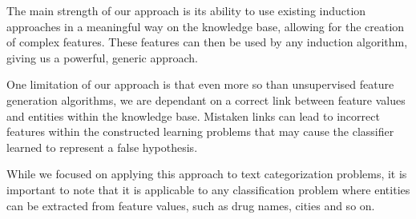 \documentclass{article}
\theoremstyle{definition}
\begin{document}
The main strength of our approach is its ability to use existing induction approaches in a meaningful way on the knowledge base, allowing for the creation of complex features. These features can then be used by any induction algorithm, giving us a powerful, generic approach.

One limitation of our approach is that even more so than unsupervised feature generation algorithms,  we are dependant on a correct link between feature values and entities within the knowledge base. Mistaken links can lead to incorrect features within the constructed learning problems that may cause the classifier learned to represent a false hypothesis. 

While we focused on applying this approach to text categorization problems, it is important to note that it is applicable to any classification problem where entities can be extracted from feature values, such as drug names, cities and so on. 

\clearpage


\end{document}
